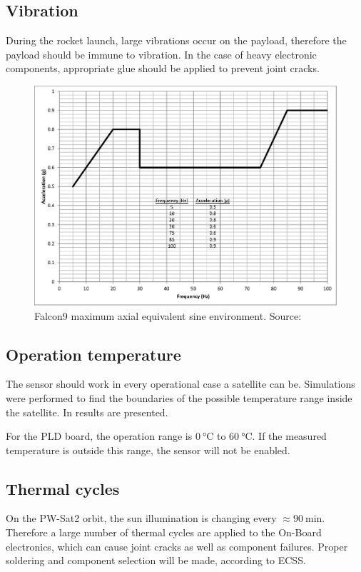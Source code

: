     \subsection{Vibration}
        During the rocket launch, large vibrations occur on the payload, therefore the payload should be immune to vibration. In the case of heavy electronic components, appropriate glue should be applied to prevent joint cracks.
        \begin{figure}[H]
            \centering
            \includegraphics[width=0.5\paperwidth]{img/Falcon9_vibration.eps}
            \caption{Falcon9 maximum axial equivalent sine environment. Source: \cite{Falcon9_user_manual}}
            \label{Falcon9_vibration}
        \end{figure}


    \subsection{Operation temperature}
        The sensor should work in every operational case a satellite can be. Simulations were performed to find the boundaries of the  possible temperature range inside the satellite.    In \cite{PWSAT_TCS_CDR} results are presented.

        For the PLD board, the operation range is $\SI{0}{\degreeCelsius}$ to $\SI{60}{\degreeCelsius}$. If the measured temperature is outside this range, the sensor will not be enabled.


    \subsection{Thermal cycles}
        On the PW-Sat2 orbit, the sun illumination is changing every $\approx \SI{90}{\minute}$. Therefore a large number of thermal cycles are applied to the On-Board electronics, which can cause joint cracks as well as component failures. Proper soldering and component selection will be made, according to ECSS.

